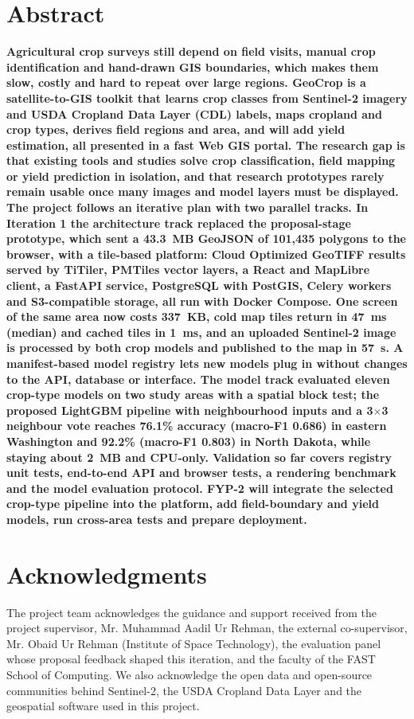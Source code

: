 \chapter*{Abstract}
\thispagestyle{plain}
\textbf{Agricultural crop surveys still depend on field visits, manual crop identification and
hand-drawn GIS boundaries, which makes them slow, costly and hard to repeat over large regions.
GeoCrop is a satellite-to-GIS toolkit that learns crop classes from Sentinel-2 imagery and USDA
Cropland Data Layer (CDL) labels, maps cropland and crop types, derives field regions and area,
and will add yield estimation, all presented in a fast Web GIS portal. The research gap is that
existing tools and studies solve crop classification, field mapping or yield prediction in
isolation, and that research prototypes rarely remain usable once many images and model layers
must be displayed. The project follows an iterative plan with two parallel tracks. In Iteration 1
the architecture track replaced the proposal-stage prototype, which sent a 43.3~MB GeoJSON of
101,435 polygons to the browser, with a tile-based platform: Cloud Optimized GeoTIFF results served
by TiTiler, PMTiles vector layers, a React and MapLibre client, a FastAPI service, PostgreSQL with
PostGIS, Celery workers and S3-compatible storage, all run with Docker Compose. One screen of the
same area now costs 337~KB, cold map tiles return in 47~ms (median) and cached tiles in 1~ms, and an
uploaded Sentinel-2 image is processed by both crop models and published to the map in 57~s. A
manifest-based model registry lets new models plug in without changes to the API, database or
interface. The model track evaluated eleven crop-type models on two study areas with a spatial
block test; the proposed LightGBM pipeline with neighbourhood inputs and a 3$\times$3 neighbour vote
reaches 76.1\% accuracy (macro-F1 0.686) in eastern Washington and 92.2\% (macro-F1 0.803) in North
Dakota, while staying about 2~MB and CPU-only. Validation so far covers registry unit tests,
end-to-end API and browser tests, a rendering benchmark and the model evaluation protocol. FYP-2
will integrate the selected crop-type pipeline into the platform, add field-boundary and yield
models, run cross-area tests and prepare deployment.}

\chapter*{Acknowledgments}
\thispagestyle{plain}
The project team acknowledges the guidance and support received from the project supervisor,
Mr. Muhammad Aadil Ur Rehman, the external co-supervisor, Mr. Obaid Ur Rehman (Institute of Space
Technology), the evaluation panel whose proposal feedback shaped this iteration, and the faculty of
the FAST School of Computing. We also acknowledge the open data and open-source communities behind
Sentinel-2, the USDA Cropland Data Layer and the geospatial software used in this project.

